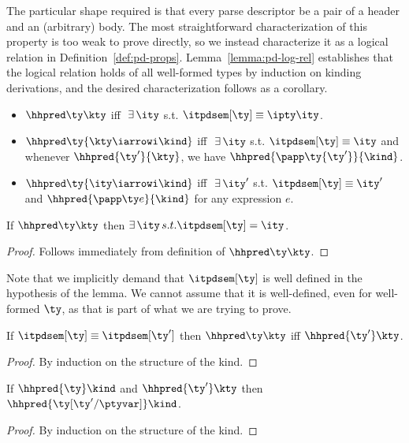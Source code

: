 The particular shape required is that every parse descriptor be a pair
of a header and an (arbitrary) body. The most straightforward
characterization of this property is too weak to prove directly, so we
instead characterize it as a logical relation in
Definition~\ref{def:pd-props}.  Lemma~\ref{lemma:pd-log-rel}
establishes that the logical relation holds of all well-formed \ddca{}
types by induction on kinding derivations, and the desired
characterization follows as a corollary.

\begin{definition}
\label{def:pd-props}
\begin{itemize}
\item $\hhpred \ty \kty$ iff $\ \exists\,\ity$ s.t. $\itpdsem[\ty] \equiv
  {\ipty \ity}$.
\item $\hhpred \ty {\kty \iarrowi \kind}$ iff $\ \exists\,\ity$
  s.t. $\itpdsem[\ty] \equiv \ity$ and whenever $\hhpred
  {\ty'}{\kty}$, we have $\hhpred {\papp \ty {\ty'}}{\kind}$.
\item $\hhpred \ty {\ity \iarrowi \kind}$ iff $\ \exists\,\ity'$
  s.t. $\itpdsem[\ty] \equiv \ity'$ and $\hhpred{\papp \ty e}{\kind}$
  for any expression $e$.
\end{itemize}
\end{definition}

\begin{lemma}
  If $\hhpred \ty \kty$ then $\exists \, \ity \, s.t. \itpdsem[\ty] =
  \ity$.
\label{lemma:H-prop}
\end{lemma}
\begin{proof}
  Follows immediately from definition of $\hhpred \ty \kty$.
\end{proof}

Note that we implicitly demand that $\itpdsem[\ty]$ is well defined in
the hypothesis of the lemma. We cannot assume that it is well-defined,
even for well-formed $\ty$, as that is part of what we are trying to
prove.

\begin{lemma}
  If $\itpdsem[\ty] \equiv \itpdsem[\ty']$ then $\hhpred \ty \kty$ iff $\hhpred {\ty'} \kty$.
\label{lemma:eq-preserve-H}
\end{lemma}
\begin{proof}
  By induction on the structure of the kind.
\end{proof}

\begin{lemma}
  If $\hhpred {\ty} \kind$ and $\hhpred {\ty'} \kty$ then $\hhpred {\ty[\ty'/\ptyvar]} \kind$.
\label{lemma:hh-subst}
\label{lemma:sub-preserve-H}
\end{lemma}
\begin{proof}
  By induction on the structure of the kind. 
\end{proof}


